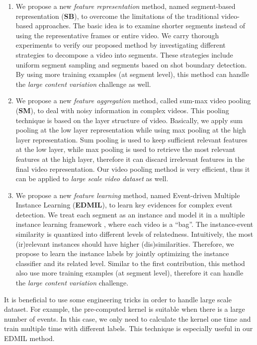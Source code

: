 \begin{enumerate}
	\item We propose a new \textit{feature representation} method, named segment-based representation (\textbf{SB}), to overcome the limitations of the traditional video-based approaches. The basic idea is to examine shorter segments instead of using the representative frames or entire video. We carry thorough experiments to verify our proposed method by investigating different strategies to decompose a video into segments. These strategies include uniform segment sampling and segments based on shot boundary detection. By using more training examples (at segment level), this method can handle the \textit{large content variation} challenge as well.
	
	\item We propose a new \textit{feature aggregation} method, called sum-max video pooling (\textbf{SM}), to deal with noisy information in complex videos. This pooling technique is based on the layer structure of video. Basically, we apply sum pooling at the low layer representation while using max pooling at the high layer representation. Sum pooling is used to keep sufficient relevant features at the low layer, while max pooling is used to retrieve the most relevant features at the high layer, therefore it can discard irrelevant features in the final video representation. Our video pooling method is very efficient, thus it can be applied to \textit{large scale video dataset} as well.
	
	\item We propose a new \textit{feature learning} method, named Event-driven Multiple Instance Learning (\textbf{EDMIL}), to learn key evidences for complex event detection. We treat each segment as an instance and model it in a multiple instance learning framework \cite{andrews2002support}, where each video is a ``bag''. The instance-event similarity is quantized into different levels of relatedness. Intuitively, the most (ir)relevant instances should have higher (dis)similarities. Therefore, we propose to learn the instance labels by jointly optimizing the instance classifier and its related level. Similar to the first contribution, this method also use more training examples (at segment level), therefore it can handle the \textit{large content variation} challenge.
\end{enumerate}

It is beneficial to use some engineering tricks in order to handle large scale dataset. For example, the pre-computed kernel is suitable when there is a large number of events. In this case, we only need to calculate the kernel one time and train multiple time with different labels. This technique is especially useful in our EDMIL method.


